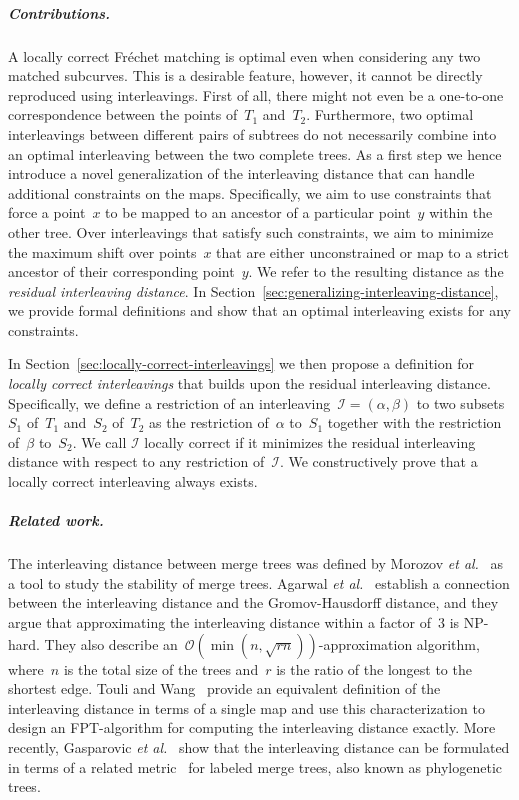 \documentclass[a4paper,UKenglish, autoref, thm-restate, cleveref]{lipics-v2021}
\newcommand{\etal}{\emph{et al.}}
\newcommand{\bigO}{\mathcal{O}}
\newcommand{\I}{\mathcal{I}}
\begin{document}
\subparagraph{Contributions.}
A locally correct Fréchet matching is optimal even when considering any two matched subcurves.
This is a desirable feature, however, it cannot be directly reproduced using interleavings.
First of all, there might not even be a one-to-one correspondence between the points of~$T_1$ and~$T_2$. 
Furthermore, two optimal interleavings between different pairs of subtrees do not necessarily combine into an optimal interleaving between the two complete trees. 
As a first step we hence introduce a novel generalization of the interleaving distance that can handle additional constraints on the maps. 
Specifically, we aim to use constraints that force a point~$x$ to be mapped to an ancestor of a particular point~$y$ within the other tree.
Over interleavings that satisfy such constraints, we aim to minimize the maximum shift over points~$x$ that are either unconstrained or map to a strict ancestor of their corresponding point~$y$.
We refer to the resulting distance as the \emph{residual interleaving distance}.
In Section~\ref{sec:generalizing-interleaving-distance}, we provide formal definitions and show that an optimal interleaving exists for any constraints.

In Section~\ref{sec:locally-correct-interleavings} we then propose a definition for \emph{locally correct interleavings} that builds upon the residual interleaving distance. 
Specifically, we define a restriction of an interleaving~${\I = (\alpha, \beta)}$ to two subsets~$S_1$ of~$T_1$ and~$S_2$ of~$T_2$ as the restriction of~$\alpha$ to~$S_1$ together with the restriction of~$\beta$ to~$S_2$.
We call $\I$ locally correct if it minimizes the residual interleaving distance with respect to any restriction of~$\I$.
We constructively prove that a locally correct interleaving always exists.

\subparagraph{Related work.}
The interleaving distance between merge trees was defined by Morozov \etal~\cite{morozov2013interleaving} as a tool to study the stability of merge trees.
Agarwal \etal~\cite{agarwal2018computing} establish a connection between the interleaving distance and the Gromov-Hausdorff distance, and they argue that approximating the interleaving distance within a factor of~$3$ is NP-hard.
They also describe an~$\bigO(\min(n, \sqrt{rn}))$-approximation algorithm, where~$n$ is the total size of the trees and~$r$ is the ratio of the longest to the shortest edge.
Touli and Wang~\cite{touli2022fpt} provide an equivalent definition of the interleaving distance in terms of a single map and use this characterization to design an FPT-algorithm for computing the interleaving distance exactly.
More recently, Gasparovic \etal~\cite{gasparovic2024intrinsic} show that the interleaving distance can be formulated in terms of a related metric~\cite{munch2019the} for labeled merge trees, also known as phylogenetic trees.
\end{document}
